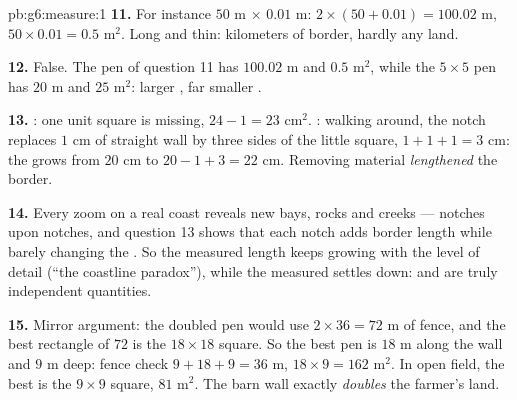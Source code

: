 \begin{solution}{pb:g6:measure:1}
\textbf{11.} For instance $50$ m $\times$ $0.01$ m: 
$2 \times (50 + 0.01) = 100.02$ m, 
$50 \times 0.01 = 0.5$ m$^2$. Long and thin: kilometers of
border, hardly any land.

\textbf{12.} False. The pen of question 11 has 
$100.02$ m and  $0.5$ m$^2$, while the $5 \times 5$ pen has
 $20$ m and  $25$ m$^2$: larger , far
smaller .

\textbf{13.} : one unit square is missing,
$24 - 1 = 23$ cm$^2$. : walking around, the notch
replaces $1$ cm of straight wall by three sides of the little
square, $1 + 1 + 1 = 3$ cm: the  grows from $20$ cm to
$20 - 1 + 3 = 22$ cm. Removing material \emph{lengthened} the
border.

\textbf{14.} Every zoom on a real coast reveals new bays, rocks
and creeks --- notches upon notches, and question 13 shows that
each notch adds border length while barely changing the .
So the measured length keeps growing with the level of detail
(``the coastline paradox''), while the measured  settles
down:  and  are truly independent quantities.

\textbf{15.} Mirror argument: the doubled pen would use
$2 \times 36 = 72$ m of fence, and the best rectangle of
 $72$ is the $18 \times 18$ square. So the best pen is
$18$ m along the wall and $9$ m deep: fence check
$9 + 18 + 9 = 36$ m,  $18 \times 9 = 162$ m$^2$. In open
field, the best is the $9 \times 9$ square,  $81$ m$^2$.
The barn wall exactly \emph{doubles} the farmer's land.
\end{solution}
